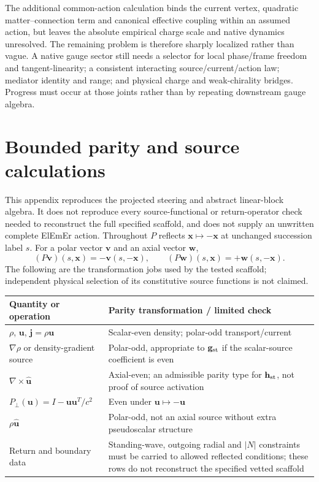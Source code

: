\documentclass[11pt]{article}
\theoremstyle{definition}
\begin{document}
The additional common-action calculation binds the current vertex, quadratic matter--connection term and canonical effective coupling within an assumed action, but leaves the absolute empirical charge scale and native dynamics unresolved.  The remaining problem is therefore sharply localized rather than vague.  A native gauge sector still needs a selector for local phase/frame freedom and tangent-linearity; a consistent interacting source/current/action law; mediator identity and range; and physical charge and weak-chirality bridges.  Progress must occur at those joints rather than by repeating downstream gauge algebra.


\appendix
\section{Bounded parity and source calculations}
\label{app:parity_derivation}

This appendix reproduces the projected steering and abstract linear-block
algebra.  It does not reproduce every source-functional or return-operator
check needed to reconstruct the full specified scaffold, and does not supply
an unwritten complete ElEmEr action.
Throughout $P$ reflects $\mathbf x\mapsto-\mathbf x$ at unchanged succession
label $s$.  For a polar vector $\mathbf v$ and an axial vector $\mathbf w$,
\begin{equation}
 (P\mathbf v)(s,\mathbf x)=-\mathbf v(s,-\mathbf x),\qquad
 (P\mathbf w)(s,\mathbf x)=+\mathbf w(s,-\mathbf x).
 \label{eq:parity_polar_axial}
\end{equation}
The following are the transformation jobs used by the tested scaffold;
independent physical selection of its constitutive source functions is not
claimed.
\begin{center}
\small
\begin{tabularx}{0.96\textwidth}{@{}p{}X@{}}
\toprule
Quantity or operation & Parity transformation / limited check\\
\midrule
$\rho$, $\mathbf u$, $\mathbf j=\rho\mathbf u$ & Scalar-even density; polar-odd transport/current\\
$\nabla\rho$ or density-gradient source & Polar-odd, appropriate to $\mathbf g_{\rm st}$ if the scalar-source coefficient is even\\
$\nabla\times\hat{\mathbf u}$ & Axial-even; an admissible parity type for $\mathbf h_{\rm st}$, not proof of source activation\\
$P_\perp(\mathbf u)=I-\mathbf u\mathbf u^T/c^2$ & Even under $\mathbf u\mapsto-\mathbf u$\\
$\rho\hat{\mathbf u}$ & Polar-odd, not an axial source without extra pseudoscalar structure\\
Return and boundary data & Standing-wave, outgoing radial and $|N|$ constraints must be carried to allowed reflected conditions; these rows do not reconstruct the specified vetted scaffold\\
\bottomrule
\end{tabularx}
\end{center}
\end{document}
